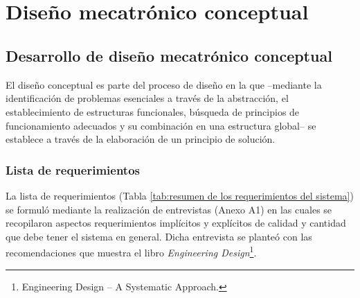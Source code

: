 
\pagestyle{myportland}
\doublespacing
\chapter[\quad\quad\quad\quad ----- Diseño mecatrónico conceptual]{\\ Diseño mecatrónico conceptual}
\thispagestyle{myportland}

\section{Desarrollo de diseño mecatrónico conceptual}
\label{sec:desarrollo del diseno mecatronico conceptual}

El diseño conceptual es parte del proceso de diseño en la que --mediante la identificación de problemas esenciales a través de la abstracción, el establecimiento de estructuras funcionales, búsqueda de principios de funcionamiento adecuados y su combinación en una estructura global-- se establece a través de la elaboración de un principio de solución.\cite[p.~159]{Pahl2007}

\subsection{Lista de requerimientos}

La lista de requerimientos (Tabla \ref{tab:resumen de los requerimientos del sistema}) se formuló mediante la realización de entrevistas (Anexo  A1) en las cuales se recopilaron aspectos requerimientos implícitos y explícitos de calidad y cantidad que debe tener el sistema en general. Dicha entrevista se planteó con las recomendaciones que muestra el libro \textit{Engineering Design}\footnote{Engineering Design – A Systematic Approach.\cite[p.~144-158]{Pahl2007}}.

